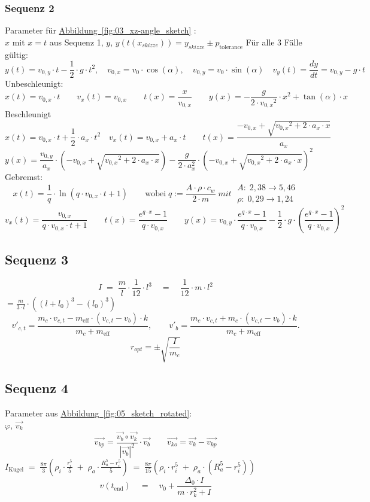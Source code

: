 \subsubsection{Sequenz 2}
Parameter für \hyperref[fig:03_xz-angle_sketch]{Abbildung~\ref*{fig:03_xz-angle_sketch}} :\\
$x$ mit $x=t$ aus Sequenz 1, $y$, $y(t(x_{skizze}))=y_{skizze}\pm p_{\text{tolerance}}$
Für alle 3 Fälle gültig:
\[
y(t) = v_{0,y} \cdot t - \frac{1}{2} \cdot g \cdot t^2,
\quad
v_{0,x} = v_0 \cdot \cos(\alpha),
\quad
v_{0,y} = v_0 \cdot \sin(\alpha)
\quad
v_y(t) = \frac{dy}{dt} = v_{0,y} - g \cdot t
\]
Unbeschleunigt:
\[
x(t) = v_{0,x} \cdot t \qquad v_x(t) = v_{0,x} \qquad t(x) = \frac{x}{v_{0,x}} \qquad y(x) = -\frac{g}{2 \cdot {v_{0,x}}^{2}} \cdot x^{2} + \tan(\alpha) \cdot x
\]
Beschleunigt
\[
x(t) = v_{0,x} \cdot t + \frac{1}{2} \cdot a_x \cdot t^2 \quad v_x(t) = v_{0,x} + a_x \cdot t \qquad t(x) = \frac{-v_{0,x} + \sqrt{{v_{0,x}}^2 + 2 \cdot a_x \cdot x}}{a_x}
\]
\[
y(x) = \frac{v_{0,y}}{a_x} \cdot \left(-v_{0,x} + \sqrt{{v_{0,x}}^2 + 2 \cdot a_x \cdot x}\right)
- \frac{g}{2 \cdot a_x^2} \cdot \left(-v_{0,x} + \sqrt{{v_{0,x}}^2 + 2 \cdot a_x \cdot x}\right)^2
\]
Gebremst:
\[
x(t) = \frac{1}{q} \cdot \ln\!\left(q \cdot v_{0,x} \cdot t + 1 \right) \qquad \text{wobei} \; q := \frac{A \cdot \rho \cdot c_w}{2 \cdot m} \; mit \; \begin{smallmatrix} A:\; 2,38 \rightarrow 5,46 \\[2pt] \rho:\; 0,29 \rightarrow 1,24 \end{smallmatrix}
\]
\[
v_x(t) = \frac{v_{0,x}}{q \cdot v_{0,x} \cdot t + 1} \qquad t(x) = \frac{e^{q \cdot x} - 1}{q \cdot v_{0,x}} \qquad y(x) = v_{0,y} \cdot \frac{e^{q \cdot x} - 1}{q \cdot v_{0,x}} 
- \frac{1}{2} \cdot g \cdot \left(\frac{e^{q \cdot x} - 1}{q \cdot v_{0,x}}\right)^2
\]
\subsection{Sequenz 3}
\[
I \; = \; \frac{m}{l} \cdot\frac{1}{12} \cdot  l^3 \quad = \quad \frac{1}{12} \cdot m \cdot l^2
\]
$\displaystyle = \frac{m}{3\cdot l} \cdot \left(\left(l+l_0\right)^3 - \left(l_0\right)^3 \right)$
\[
v'_{c,t} = \frac{m_c \cdot v_{c,t} - m_{\text{eff}} \cdot (v_{c,t} - v_b) \cdot k}{m_c + m_{\text{eff}}},
\qquad
v'_{b} = \frac{m_c \cdot v_{c,t} + m_c \cdot (v_{c,t} - v_b) \cdot k}{m_c + m_{\text{eff}}}.
\]
\[
r_{opt} = \pm \sqrt{\frac{I}{m_c}}
\]
\subsection{Sequenz 4}
Parameter aus \hyperref[fig:05_sketch_rotated]{Abbildung~\ref*{fig:05_sketch_rotated}}:\\
$\varphi$, $\vec{v_k}$
\[
\vec{v_{kp}} = \frac{\vec{v_b} \circ \vec{v_k}}{|\vec{v_b}|^2} \cdot \vec{v_b} \qquad 	\vec{v_{ko}} = \vec{v_k} - \vec{v_{kp}}
\]
$\displaystyle I_\text{Kugel} \;=\; \frac{8\pi}{3}\left( \rho_i \cdot \frac{r_i^5}{5} \;+\; \rho_a \cdot \frac{R_a^5 - r_i^5}{5} \right)\;=\; \frac{8\pi}{15} \left( \rho_i \cdot r_i^5 \;+\; \rho_a \cdot (R_a^5 - r_i^5)\right)$
\\[8pt]
\[
v(t_{\text{end}}) \quad = \quad v_0 + \frac{\Delta_0 \cdot I}{m \cdot r_k^2 + I}
\]
\fi